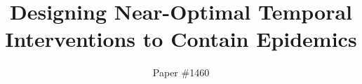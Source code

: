 \documentclass[sigconf]{aamas}  %
\begin{document}
\title{Designing Near-Optimal Temporal Interventions to Contain Epidemics}  %


\author{Paper \#1460}  %

%
%
%
%
%
%
%
%
\end{document}
